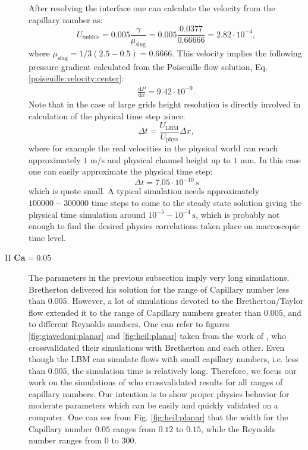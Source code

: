 \documentclass{article}
\begin{document}
\begin{description}
After resolving the interface one can  calculate the
  velocity from the capillary number as:
  \begin{equation}
  U_{\mathrm{bubble}}=0.005 \frac{\gamma}{\mu_{\mathrm{slug}}}=0.005
\frac{0.0377}{0.66666}=2.82 \cdot10^{-4},
  \end{equation}
  where $\mu_{\mathrm{slug}}=1/3 (2.5-0.5)=0.6666$.
  This velocity implies the following pressure gradient calculated from the
  Poiseuille flow solution, Eq. \ref{poiseuille:velocity:center}: 
  \begin{equation}
  \begin{aligned}
  \frac{\mathrm{d}P}{\mathrm{d}x}=9.42 \cdot 10^{-9}.
  \end{aligned}
  \end{equation}
  Note that in the case of large grids  height resolution is directly
involved in calculation of the physical time step :since:
\begin{equation}
\Delta t =\frac{U_{\mathrm{LBM}}}{U_{\mathrm{phys}}} \Delta x ,
\end{equation}
where for example the real velocities in the physical world can reach
approximately $1$ m/s and physical channel height up to $1$ mm. In this case one
can easily approximate the physical time step:
\begin{equation}
\Delta t = 7.05 \cdot 10^{-10} \,\mathrm{s}
\end{equation}
which is quote small. A typical simulation needs approximately
$100000-300000$ time steps to come to the steady state solution giving the
physical time simulation around $10^{-5}-10^{-4}\,\mathrm{s}$, which is
probably not enough to find the desired physics correlations taken place on macroscopic time level.

 \item[II $\bm{Ca=0.05}$] 
   The parameters in the previous subsection imply very long
simulations. Bretherton delivered his solution for the range of Capillary number
less than
  $0.005$. However, a lot of simulations devoted to the Bretherton/Taylor
flow extended it to the range of Capillary numbers greater than
$0.005$, and to different Reynolds numbers. One can refer to figures
  \ref{fig:giavedoni:planar} and \ref{fig:heil:planar} taken from the work of
  \citet{giavedoni-numerical,heil-bretherton}, who crossvalidated their
  simulations with Bretherton and each other. Even though the LBM can simulate
flows with small capillary numbers, i.e. less than $0.005$, the simulation time
is relatively long. Therefore, we focus our work on the simulations of
\citet{giavedoni-numerical} who crossvalidated
results for all ranges of capillary numbers.  Our intention is
  to show proper physics behavior for moderate parameters
which
  can be easily and quickly validated on a computer.
  One can see from Fig. \ref{fig:heil:planar} that the width for the
  Capillary number $0.05$ ranges from $0.12$ to $0.15$, while the Reynolds
  number ranges from $0$ to $300$.


\end{description}
\end{document}
